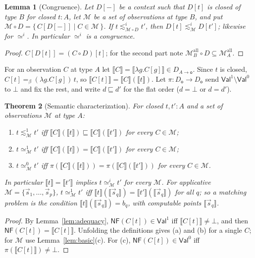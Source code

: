 \documentclass[11pt]{article}
\newcommand{\Ground}{\mathsf{o}\xspace}
\newcommand{\NF}{\mathsf{NF}\xspace}
\newcommand{\Val}{\mathsf{Val}\xspace}
\newcommand{\ObsEq}{\mathrel{\simeq}\xspace}
\newcommand{\ObsLeq}{\mathrel{\lesssim}\xspace}
\newcommand{\sem}[1]{\llbracket #1\rrbracket}
\newtheorem{theorem}{Theorem}[section]
\newtheorem{lemma}[theorem]{Lemma}
\theoremstyle{definition}
\begin{document}
\begin{lemma}[Congruence]\label{lem:congruence}
Let $D[-]$ be a context such that $D[t]$ is closed of type $B$ for closed
$t:A$, let $\mathcal M$ be a set of observations at type $B$, and put
$\mathcal M\circ D=\{\,C[D[-]]\mid C\in\mathcal M\,\}$.  If
$t\ObsLeq^i_{\mathcal M\circ D}t'$, then $D[t]\ObsLeq^i_{\mathcal M}D[t']$;
likewise for $\ObsEq^i$.  In particular $\ObsEq^i$ is a congruence.
\end{lemma}
\begin{proof}
$C[D[t]]=(C\circ D)[t]$; for the second part note
$\mathcal M^{\mathrm{all}}_B\circ D\subseteq\mathcal M^{\mathrm{all}}_A$.
\end{proof}

For an observation $C$ at type $A$ let $\sem{C}=\sem{\lambda g.C[g]}\in
D_{A\to\Ground}$.  Since $t$ is closed, $C[t]=_\beta(\lambda g.C[g])\,t$,
so $\sem{C[t]}=\sem{C}(\sem{t})$.  Let $\pi:D_\Ground\to D_\Ground$ send
$\Val^1\setminus\Val^0$ to $\bot$ and fix the rest, and write
$d\sqsubseteq d'$ for the flat order ($d=\bot$ or $d=d'$).

\begin{theorem}[Semantic characterization]\label{thm:semchar}
For closed $t,t':A$ and a set of observations $\mathcal M$ at type $A$:
\begin{enumerate}[label=(\alph*)]
\item $t\ObsLeq^1_{\mathcal M}t'$ iff
  $\sem{C}(\sem t)\sqsubseteq\sem{C}(\sem{t'})$ for every $C\in\mathcal M$;
\item $t\ObsEq^1_{\mathcal M}t'$ iff
  $\sem{C}(\sem t)=\sem{C}(\sem{t'})$ for every $C\in\mathcal M$;
\item $t\ObsEq^0_{\mathcal M}t'$ iff
  $\pi(\sem{C}(\sem t))=\pi(\sem{C}(\sem{t'}))$ for every $C\in\mathcal M$.
\end{enumerate}
In particular $\sem t=\sem{t'}$ implies $t\ObsEq^i_{\mathcal M}t'$ for
every $\mathcal M$.  For applicative $\mathcal M=\{\vec s_1,\ldots,\vec s_p\}$,
$t\ObsEq^1_{\mathcal M}t'$ iff $\sem t(\sem{\vec s_q})=\sem{t'}(\sem{\vec s_q})$
for all $q$; so a matching problem is the condition
$\sem t(\sem{\vec s_q})=b_q$, with computable points $\sem{\vec s_q}$.
\end{theorem}
\begin{proof}
By Lemma~\ref{lem:adequacy}, $\NF(C[t])\in\Val^1$ iff
$\sem{C[t]}\neq\bot$, and then $\NF(C[t])=\sem{C[t]}$.  Unfolding the
definitions gives (a) and (b) for a single $C$; for $\mathcal M$ use
Lemma~\ref{lem:basic}(c).  For (c), $\NF(C[t])\in\Val^0$ iff
$\pi(\sem{C[t]})\neq\bot$.
\end{proof}
\end{document}
